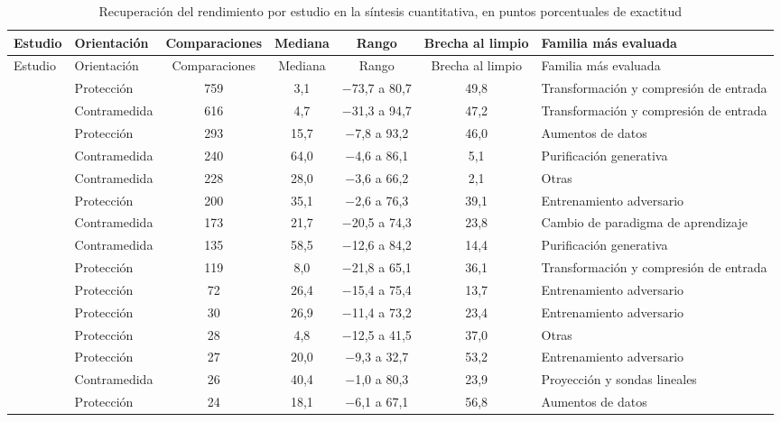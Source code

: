 \begin{footnotesize}
\begin{longtable}{@{}lL{1.7cm}cccc L{3.2cm}@{}}
\caption{Recuperación del rendimiento por estudio en la síntesis cuantitativa, en puntos porcentuales de exactitud}\label{tab:apnucleo}\\
\toprule
Estudio & Orientación & Comparaciones & Mediana & Rango & Brecha al limpio & Familia más evaluada \\
\midrule
\endfirsthead
\toprule
Estudio & Orientación & Comparaciones & Mediana & Rango & Brecha al limpio & Familia más evaluada \\
\midrule
\endhead
\botrule
\endfoot
\cite{S0047} & Protección & 759 & 3,1 & $-$73,7 a 80,7 & 49,8 & Transformación y compresión de entrada \\
\cite{S0105} & Contramedida & 616 & 4,7 & $-$31,3 a 94,7 & 47,2 & Transformación y compresión de entrada \\
\cite{S0095} & Protección & 293 & 15,7 & $-$7,8 a 93,2 & 46,0 & Aumentos de datos \\
\cite{S0129} & Contramedida & 240 & 64,0 & $-$4,6 a 86,1 & 5,1 & Purificación generativa \\
\cite{S0054} & Contramedida & 228 & 28,0 & $-$3,6 a 66,2 & 2,1 & Otras \\
\cite{S0075} & Protección & 200 & 35,1 & $-$2,6 a 76,3 & 39,1 & Entrenamiento adversario \\
\cite{S0121} & Contramedida & 173 & 21,7 & $-$20,5 a 74,3 & 23,8 & Cambio de paradigma de aprendizaje \\
\cite{S0093} & Contramedida & 135 & 58,5 & $-$12,6 a 84,2 & 14,4 & Purificación generativa \\
\cite{S0072} & Protección & 119 & 8,0 & $-$21,8 a 65,1 & 36,1 & Transformación y compresión de entrada \\
\cite{S0138} & Protección & 72 & 26,4 & $-$15,4 a 75,4 & 13,7 & Entrenamiento adversario \\
\cite{S0144} & Protección & 30 & 26,9 & $-$11,4 a 73,2 & 23,4 & Entrenamiento adversario \\
\cite{S0030} & Protección & 28 & 4,8 & $-$12,5 a 41,5 & 37,0 & Otras \\
\cite{S0063} & Protección & 27 & 20,0 & $-$9,3 a 32,7 & 53,2 & Entrenamiento adversario \\
\cite{S0005} & Contramedida & 26 & 40,4 & $-$1,0 a 80,3 & 23,9 & Proyección y sondas lineales \\
\cite{S0068} & Protección & 24 & 18,1 & $-$6,1 a 67,1 & 56,8 & Aumentos de datos \\

\end{longtable}
\end{footnotesize}
